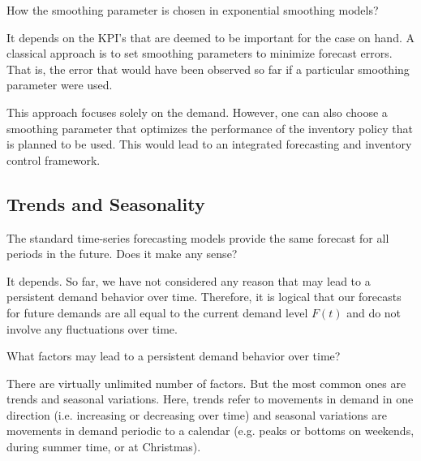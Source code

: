 \begin{question}
How the smoothing parameter is chosen in exponential smoothing models?

  \begin{solution}
	It depends on the KPI's that are deemed to be important for the case on hand. A classical approach is to set smoothing parameters to minimize forecast errors. That is, the error that would have been observed so far if a particular smoothing parameter were used. 
	
	This approach focuses solely on the demand. However, one can also choose a smoothing parameter that optimizes the performance of the inventory policy that is planned to be used. This would lead to an integrated forecasting and inventory control framework.
  \end{solution}
\end{question}


\subsection{Trends and Seasonality}

\begin{question}
The standard time-series forecasting models provide the same forecast for all periods in the future. Does it make any sense? 

  \begin{solution}
    It depends. So far, we have not considered any reason that may lead to a persistent demand behavior over time. Therefore, it is logical that our forecasts for future demands are all equal to the current demand level $F(t)$ and do not involve any fluctuations over time.     
      \end{solution}
\end{question}

\begin{question}
What factors may lead to a persistent demand behavior over time?

  \begin{solution}
    There are virtually unlimited number of factors. But the most common ones are trends and seasonal variations. Here, trends refer to movements in demand in one direction (i.e. increasing or decreasing over time) and seasonal variations are movements in demand periodic to a calendar (e.g. peaks or bottoms on weekends, during summer time, or at Christmas).
      \end{solution}
\end{question}

